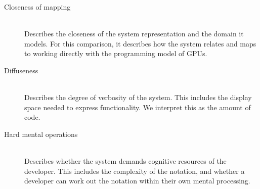 \begin{description}
    \item[Closeness of mapping]\hfill\\
    Describes the closeness of the system representation and the domain it models. For this comparison, it describes how the system relates and maps to working directly with the programming model of GPUs.  
    \item[Diffuseness]\hfill\\
    Describes the degree of verbosity of the system. This includes the display space needed to express functionality. We interpret this as the amount of code.
    \item[Hard mental operations]\hfill\\
    Describes whether the system demands cognitive resources of the developer. This includes the complexity of the notation, and whether a developer can work out the notation within their own mental processing.
\end{description}